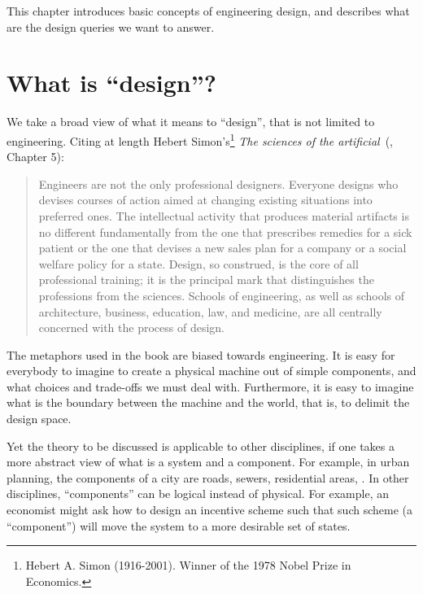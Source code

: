 This chapter introduces basic concepts of engineering design, and describes what are the design queries we want to answer.


\section{What is ``design''?}
\label{sec:design-what-is-design}


We take a broad view of what it means to ``design'', that is not limited to engineering.
Citing at length Hebert Simon's\footnote{Hebert A. Simon (1916-2001). Winner of the 1978 Nobel Prize in Economics.}
\emph{The sciences of the artificial}~(\cite{hebert96sciences}, Chapter 5):

\begin{quote}
    Engineers are not the only professional designers.
    Everyone designs who devises courses of action aimed at changing existing situations into preferred ones.
    The intellectual activity that produces material artifacts is no different fundamentally from the one that prescribes remedies for a sick patient or the one that devises a new sales plan for a company or a social welfare policy for a state.
    Design, so construed, is the core of all professional training;
    it is the principal mark that distinguishes the professions from the sciences.
    Schools of engineering, as well as schools of architecture, business, education, law, and medicine, are all centrally concerned with the process of design.
\end{quote}

The metaphors used in the book are biased towards engineering.
It is easy for everybody to imagine to create a physical machine out of simple components, and what choices and trade-offs we must deal with.
Furthermore, it is easy to imagine what is the boundary between the machine and the world, that is, to delimit the design space.

Yet the theory to be discussed is applicable to other disciplines, if one takes a more abstract view of what is a system and a component.
For example, in urban planning, the components of a city are roads, sewers, residential areas, \etc.
In other disciplines, ``components'' can be logical instead of physical.
For example, an economist might ask how to design an incentive scheme such that such scheme (a ``component'') will move the system to a more
desirable set of states.
